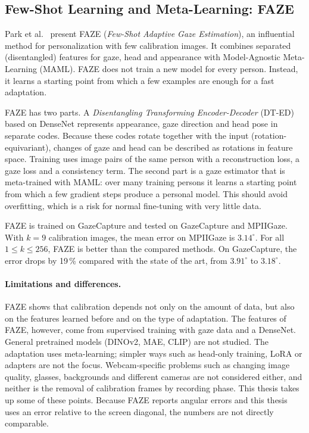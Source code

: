 \subsection{Few-Shot Learning and Meta-Learning: FAZE}
\label{subsec:faze}
Park et al.~\cite{park2019faze} present FAZE (\emph{Few-Shot Adaptive Gaze
Estimation}), an influential method for personalization with few calibration
images. It combines separated (disentangled) features for gaze, head and
appearance with Model-Agnostic Meta-Learning (MAML). FAZE does not train a new
model for every person. Instead, it learns a starting point from which a few
examples are enough for a fast adaptation.

FAZE has two parts. A \emph{Disentangling Transforming Encoder-Decoder}
(DT-ED) based on DenseNet represents appearance, gaze direction and head pose
in separate codes. Because these codes rotate together with the input
(rotation-equivariant), changes of gaze and head can be described as rotations
in feature space. Training uses image pairs of the same person with a
reconstruction loss, a gaze loss and a consistency term. The second part is a
gaze estimator that is meta-trained with MAML: over many training persons it
learns a starting point from which a few gradient steps produce a personal
model. This should avoid overfitting, which is a risk for normal fine-tuning
with very little data.

FAZE is trained on GazeCapture and tested on GazeCapture and MPIIGaze. With
$k = 9$ calibration images, the mean error on MPIIGaze is $3.14^\circ$. For all
$1 \le k \le 256$, FAZE is better than the compared methods. On GazeCapture,
the error drops by 19\,\% compared with the state of the art, from
$3.91^\circ$ to $3.18^\circ$.

\paragraph{Limitations and differences.}
FAZE shows that calibration depends not only on the amount of data, but also on
the features learned before and on the type of adaptation. The features of
FAZE, however, come from supervised training with gaze data and a DenseNet.
General pretrained models (DINOv2, MAE, CLIP) are not studied. The adaptation
uses meta-learning; simpler ways such as head-only training, LoRA or adapters
are not the focus. Webcam-specific problems such as changing image quality,
glasses, backgrounds and different cameras are not considered either, and
neither is the removal of calibration frames by recording phase. This thesis
takes up some of these points. Because FAZE reports angular errors and this
thesis uses an error relative to the screen diagonal, the numbers are not
directly comparable.

